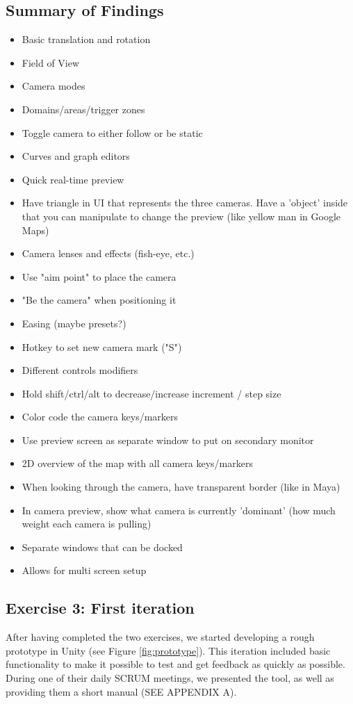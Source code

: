 \subsection{Summary of Findings}
\begin{itemize}
\item Basic translation and rotation
\item Field of View
\item Camera modes
\item Domains/areas/trigger zones
\item Toggle camera to either follow or be static
\item Curves and graph editors
\item Quick real-time preview
\item Have triangle in UI that represents the three cameras. Have a 'object' inside that you can manipulate to change the preview (like yellow man in Google Maps)
\item Camera lenses and effects (fish-eye, etc.)
\item Use "aim point" to place the camera
\item "Be the camera" when positioning it
\item Easing (maybe presets?)
\item Hotkey to set new camera mark ("S")
\item Different controls modifiers 
\item Hold shift/ctrl/alt to decrease/increase increment / step size
\item Color code the camera keys/markers
\item Use preview screen as separate window to put on secondary monitor
\item 2D overview of the map with all camera keys/markers
\item When looking through the camera, have transparent border (like in Maya)
\item In camera preview, show what camera is currently 'dominant' (how much weight each camera is pulling)
\item Separate windows that can be docked
\item Allows for multi screen setup
\end{itemize}

\subsection{Exercise 3: First iteration}
After having completed the two exercises, we started developing a rough prototype in Unity (see Figure \ref{fig:prototype}). This iteration included basic functionality to make it possible to test and get feedback as quickly as possible. During one of their daily SCRUM meetings, we presented the tool, as well as providing them a short manual (SEE APPENDIX A).


